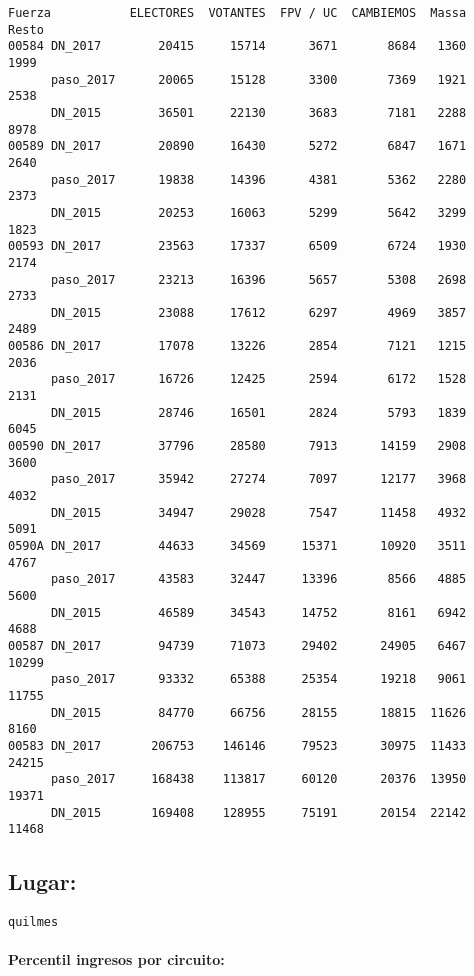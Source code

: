 \documentclass[11pt]{article}
\begin{document}
    \begin{verbatim}
Fuerza           ELECTORES  VOTANTES  FPV / UC  CAMBIEMOS  Massa  Resto
00584 DN_2017        20415     15714      3671       8684   1360   1999
      paso_2017      20065     15128      3300       7369   1921   2538
      DN_2015        36501     22130      3683       7181   2288   8978
00589 DN_2017        20890     16430      5272       6847   1671   2640
      paso_2017      19838     14396      4381       5362   2280   2373
      DN_2015        20253     16063      5299       5642   3299   1823
00593 DN_2017        23563     17337      6509       6724   1930   2174
      paso_2017      23213     16396      5657       5308   2698   2733
      DN_2015        23088     17612      6297       4969   3857   2489
00586 DN_2017        17078     13226      2854       7121   1215   2036
      paso_2017      16726     12425      2594       6172   1528   2131
      DN_2015        28746     16501      2824       5793   1839   6045
00590 DN_2017        37796     28580      7913      14159   2908   3600
      paso_2017      35942     27274      7097      12177   3968   4032
      DN_2015        34947     29028      7547      11458   4932   5091
0590A DN_2017        44633     34569     15371      10920   3511   4767
      paso_2017      43583     32447     13396       8566   4885   5600
      DN_2015        46589     34543     14752       8161   6942   4688
00587 DN_2017        94739     71073     29402      24905   6467  10299
      paso_2017      93332     65388     25354      19218   9061  11755
      DN_2015        84770     66756     28155      18815  11626   8160
00583 DN_2017       206753    146146     79523      30975  11433  24215
      paso_2017     168438    113817     60120      20376  13950  19371
      DN_2015       169408    128955     75191      20154  22142  11468
    \end{verbatim}

    
    \hypertarget{lugar}{%
\subsection{Lugar:}\label{lugar}}

    
    \begin{Verbatim}[commandchars=\\\{\}]
quilmes

    \end{Verbatim}

    \hypertarget{percentil-ingresos-por-circuito}{%
\paragraph{Percentil ingresos por
circuito:}\label{percentil-ingresos-por-circuito}}
\end{document}
